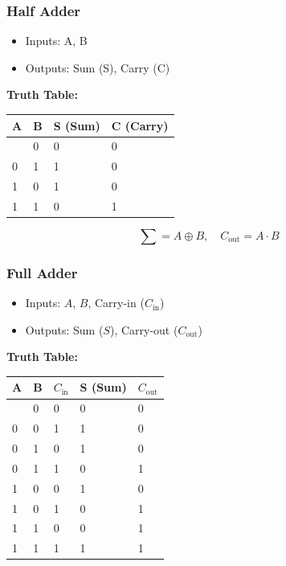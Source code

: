 \documentclass[11pt,a4paper]{article}
\providecommand{\tightlist}{\setlength{\itemsep}{1pt}\setlength{\parskip}{0pt}}
\begin{document}
\subsubsection{Half Adder}\label{half-adder}

\begin{itemize}
\tightlist
\item
  Inputs: A, B
\item
  Outputs: Sum (S), Carry (C)
\end{itemize}

\textbf{Truth Table:}

\begin{longtable}[]{@{}llll@{}}
\toprule\noalign{}
A & B & S (Sum) & C (Carry) \\
\midrule\noalign{}
\endhead
\bottomrule\noalign{}
\endlastfoot
0 & 0 & 0 & 0 \\
0 & 1 & 1 & 0 \\
1 & 0 & 1 & 0 \\
1 & 1 & 0 & 1 \\
\end{longtable}

\[ \sum = A \oplus B , \quad C_{\text{out}} = A \cdot B \]

\subsubsection{Full Adder}\label{full-adder}

\begin{itemize}
\tightlist
\item
  Inputs: \(A\), \(B\), Carry-in (\(C_{\text{in}}\))
\item
  Outputs: Sum (\(S\)), Carry-out (\(C_{\text{out}}\))
\end{itemize}

\textbf{Truth Table:}

\begin{longtable}[]{@{}lllll@{}}
\toprule\noalign{}
A & B & \(C_{\text{in}}\) & S (Sum) & \(C_{\text{out}}\) \\
\midrule\noalign{}
\endhead
\bottomrule\noalign{}
\endlastfoot
0 & 0 & 0 & 0 & 0 \\
0 & 0 & 1 & 1 & 0 \\
0 & 1 & 0 & 1 & 0 \\
0 & 1 & 1 & 0 & 1 \\
1 & 0 & 0 & 1 & 0 \\
1 & 0 & 1 & 0 & 1 \\
1 & 1 & 0 & 0 & 1 \\
1 & 1 & 1 & 1 & 1 \\
\end{longtable}
\end{document}
